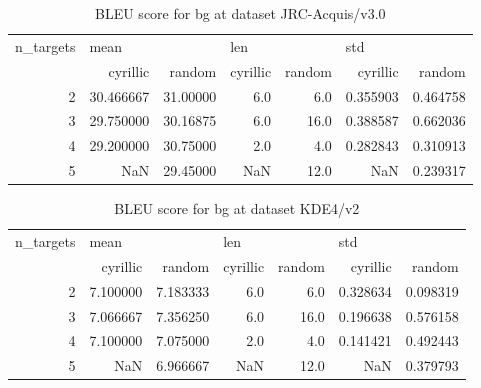 \begin{table}[h]
\begin{tabular}{rrrrrrr}
\toprule
n\_targets & \multicolumn{2}{l}{mean} & \multicolumn{2}{l}{len} & \multicolumn{2}{l}{std} \\
          &   cyrillic &    random & cyrillic & random &  cyrillic &    random \\
\midrule
        2 &  30.466667 &  31.00000 &      6.0 &    6.0 &  0.355903 &  0.464758 \\
        3 &  29.750000 &  30.16875 &      6.0 &   16.0 &  0.388587 &  0.662036 \\
        4 &  29.200000 &  30.75000 &      2.0 &    4.0 &  0.282843 &  0.310913 \\
        5 &        NaN &  29.45000 &      NaN &   12.0 &       NaN &  0.239317 \\
\bottomrule
\end{tabular}

\caption{BLEU score for  bg at dataset JRC-Acquis/v3.0 }
\label{ table:bg/JRC-Acquis/v3.0 }
\end{table}

\begin{table}[h]
\begin{tabular}{rrrrrrr}
\toprule
n\_targets & \multicolumn{2}{l}{mean} & \multicolumn{2}{l}{len} & \multicolumn{2}{l}{std} \\
          &  cyrillic &    random & cyrillic & random &  cyrillic &    random \\
\midrule
        2 &  7.100000 &  7.183333 &      6.0 &    6.0 &  0.328634 &  0.098319 \\
        3 &  7.066667 &  7.356250 &      6.0 &   16.0 &  0.196638 &  0.576158 \\
        4 &  7.100000 &  7.075000 &      2.0 &    4.0 &  0.141421 &  0.492443 \\
        5 &       NaN &  6.966667 &      NaN &   12.0 &       NaN &  0.379793 \\
\bottomrule
\end{tabular}

\caption{BLEU score for  bg at dataset KDE4/v2 }
\label{ table:bg/KDE4/v2 }
\end{table}

